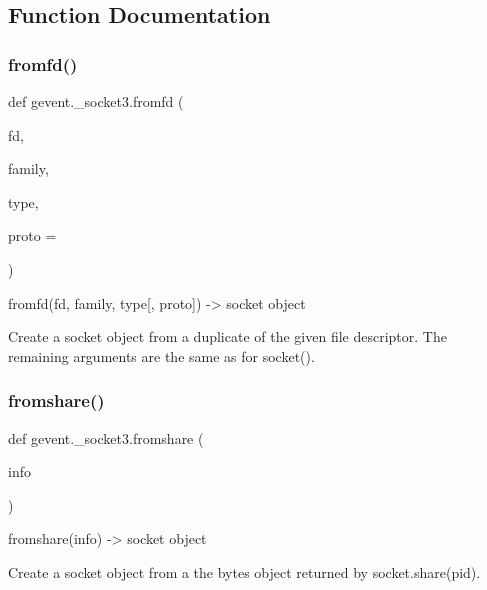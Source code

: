\subsection{Function Documentation}
\mbox{\label{namespacegevent_1_1__socket3_afee07c7980d68bbd43fe9fa22e7bc543}} 
\subsubsection{\texorpdfstring{fromfd()}{fromfd()}}
{\footnotesize\ttfamily def gevent.\+\_\+socket3.\+fromfd (\begin{DoxyParamCaption}\item[{}]{fd,  }\item[{}]{family,  }\item[{}]{type,  }\item[{}]{proto = {} }\end{DoxyParamCaption})}

\begin{DoxyVerb}fromfd(fd, family, type[, proto]) -> socket object

Create a socket object from a duplicate of the given file
descriptor.  The remaining arguments are the same as for socket().
\end{DoxyVerb}
 \mbox{\label{namespacegevent_1_1__socket3_a5f5c2b678f70a7a54b1ae17e90572992}} 
\subsubsection{\texorpdfstring{fromshare()}{fromshare()}}
{\footnotesize\ttfamily def gevent.\+\_\+socket3.\+fromshare (\begin{DoxyParamCaption}\item[{}]{info }\end{DoxyParamCaption})}

\begin{DoxyVerb}fromshare(info) -> socket object

Create a socket object from a the bytes object returned by
socket.share(pid).
\end{DoxyVerb}
 \mbox{\label{namespacegevent_1_1__socket3_ac4533378cc02af62ff3518867e7b5efd}} 
